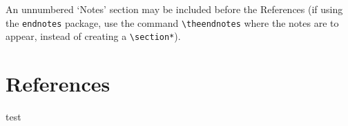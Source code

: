 \documentclass[]{interact}
\theoremstyle{plain}%
\theoremstyle{definition}
\theoremstyle{remark}
\begin{document}
An unnumbered `Notes' section may be included before the References (if using the \verb"endnotes" package, use the command \verb"\theendnotes" where the notes are to appear, instead of creating a \verb"\section*").


\section{References}

test\citep{quEffectsSandBurial2017}



\end{document}
